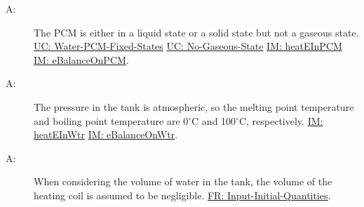 \documentclass[12pt]{article}
\newcounter{assumpnum}
\newcommand{\atheassumpnum}{A\theassumpnum}
\begin{document}
\begin{description}
\item[\atheassumpnum\label{A:No-Gaseous-State-PCM}:]The PCM is either in a liquid state or a solid state but not a gaseous state. \hyperref[unlikeChgWPFS]{UC: Water-PCM-Fixed-States} \hyperref[unlikeChgNGS]{UC: No-Gaseous-State} \hyperref[IM:heatEInPCM]{IM: heatEInPCM} \hyperref[IM:eBalanceOnPCM]{IM: eBalanceOnPCM}.
\end{description}
\begin{description}
\item[\atheassumpnum\label{A:Atmospheric-Pressure-Tank}:]The pressure in the tank is atmospheric, so the melting point temperature and boiling point temperature are 0${}^{\circ}$C and 100${}^{\circ}$C, respectively. \hyperref[IM:heatEInWtr]{IM: heatEInWtr} \hyperref[IM:eBalanceOnWtr]{IM: eBalanceOnWtr}.
\end{description}
\begin{description}
\item[\atheassumpnum\label{A:Volume-Coil-Negligible}:]When considering the volume of water in the tank, the volume of the heating coil is assumed to be negligible. \hyperref[inputInitQuants]{FR: Input-Initial-Quantities}.
\end{description}
\end{document}
